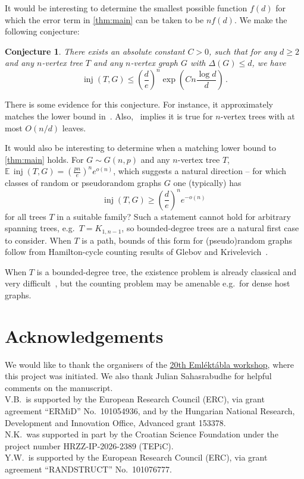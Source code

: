 \documentclass[reqno,final,a4paper]{amsart}
\numberwithin{equation}{section}
\newtheorem{conjecture}[theorem]{Conjecture}
\theoremstyle{definition}
\theoremstyle{remark}
\DeclareMathOperator{\inj}{inj}
\begin{document}
It would be interesting to determine the smallest possible function
$f(d)$ for which the error term in \cref{thm:main} can be taken to be $nf(d)$. 
We make the following conjecture:
\begin{conjecture}
    There exists an absolute constant $C>0$, such that for any $d\geq 2$ and any $n$-vertex tree $T$ and any $n$-vertex graph $G$ with $\Delta(G)\leq d$, we have 
    \[
        \inj(T,G)\leq \left(\frac{d}{e}\right)^n \exp\left(Cn\frac{\log d}{d}\right)\,.
    \]
\end{conjecture}
There is some evidence for this conjecture. For instance, it approximately matches the lower bound in~. Also,~ implies it is true for $n$-vertex trees with at most $O(n/d)$ leaves.

It would also be interesting to determine when a matching lower bound to \cref{thm:main} holds. For $G \sim G(n,p)$ and any $n$-vertex tree $T$, $\mathbb E \, \inj(T,G) = \left( \frac{pn}{e} \right)^n e^{o(n)}$, which suggests a natural direction -- for which classes of random or pseudorandom graphs $G$ one (typically) has
$$ \inj(T,G) \geq \left(\frac de\right)^n e^{-o(n)}\,$$
for all trees $T$ in a suitable family? Such a statement cannot hold for arbitrary spanning trees, e.g.~$T= K_{1,n-1}$, so bounded-degree trees are a natural first case to consider. When $T$ is a path, bounds of this form for (pseudo)random graphs follow from Hamilton-cycle counting results of Glebov and Krivelevich~\cite{glebov2013hamilton,Krivelevich2012Pseudo}. 

When $T$ is a bounded-degree tree, the existence problem is already classical and  very difficult~\cite{montgomery2019,hyde2025}, but the counting problem may be amenable e.g.~for dense host graphs. 

\section*{Acknowledgements}
We would like to thank the organisers of the \href{https://www.renyi.hu/~emlektab/main_news.html}{20th Eml\'ekt\'abla workshop}, where this project was initiated. We also thank Julian Sahasrabudhe for helpful comments on the manuscript.\\
V.B.~is supported by the European Research Council (ERC), via grant agreement ``ERMiD'' No.\ 101054936, and by the Hungarian National Research, Development and Innovation Office, Advanced grant 153378. \\
N.K.~was supported in part by the Croatian Science Foundation under the project number HRZZ-IP-2026-2389 (TEPiC).\\
Y.W.~is supported by the European Research Council (ERC), via grant agreement ``RANDSTRUCT'' No.\ 101076777.
\end{document}
